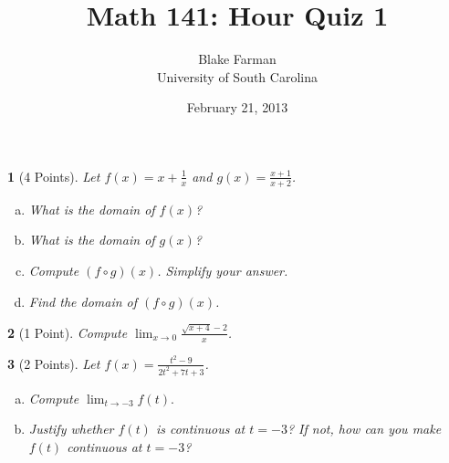 \documentclass[10pt]{amsart}
\author{Blake Farman\\University of South Carolina}
\title{Math 141: Hour Quiz 1}
\date{February 21, 2013}
\begin{document}
\maketitle

\begin{center}
\end{center}

\vspace{0.2in}
\vspace{0.2in}

\theoremstyle{plain}
\newtheorem{thm}{}
\newtheorem{lem}{Lemma}
\theoremstyle{definition}
\newtheorem{defn}{Definition}

\begin{thm}[4 Points]
  Let $f(x) = x + \frac{1}{x}$ and $g(x) = \frac{x+1}{x + 2}$.
  \begin{enumerate}[(a)]
  \item
    What is the domain of $f(x)$?
    \vspace{.5in}
  \item
    What is the domain of $g(x)$?
    \vspace{.5in}
  \item
    Compute $(f \circ g)(x)$.
    Simplify your answer.
    \vspace{.5in}
  \item
    Find the domain of $(f \circ g)(x)$. 
    \vspace{.5in}
  \end{enumerate}
\end{thm}

\begin{thm}[1 Point]
  Compute $\lim_{x \rightarrow 0} \frac{\sqrt{x + 4} - 2}{x}$.
\end{thm}
\pagebreak
\begin{thm}[2 Points]
  Let $f(x) = \frac{t^2 - 9}{2t^2 +7t + 3}$.
  \begin{enumerate}[(a)]
  \item
    Compute $\lim_{t \rightarrow -3} f(t).$
    \vspace{.5in}
  \item
    Justify whether $f(t)$ is continuous at $t = -3$?
    If not, how can you make $f(t)$ continuous at $t = -3$?
    \vspace{1.0in}
  \end{enumerate}
\end{thm}
\end{document}
